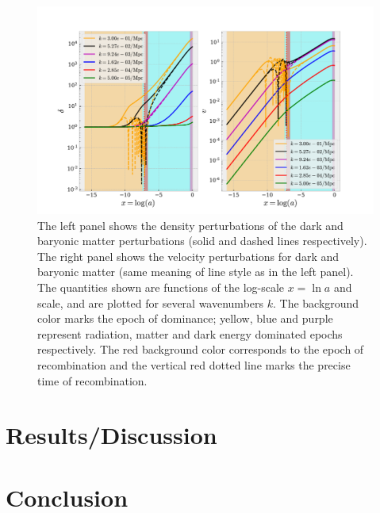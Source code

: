 \documentclass[twocolumn]{aastex62}
\begin{document}
\begin{figure}
    \includegraphics[scale = 0.65]{Figures/fig2.pdf}
    \caption{The left panel shows the density perturbations of the dark and baryonic matter perturbations (solid and dashed lines respectively). The right panel shows the velocity perturbations for dark and baryonic matter (same meaning of line style as in the left panel). The quantities shown are functions of the log-scale $x = \ln a$ and scale, and are plotted for several wavenumbers $k$.  The background color marks the epoch of dominance; yellow, blue and purple represent radiation, matter and dark energy dominated epochs respectively. The red background color corresponds to the epoch of recombination and the vertical red dotted line marks the precise time of recombination.}
    \label{fig:fig2}
\end{figure}


\section{Results/Discussion}\label{sec:Results}

\section{Conclusion} \label{sec:Conclusion}

\newpage


\end{document}
